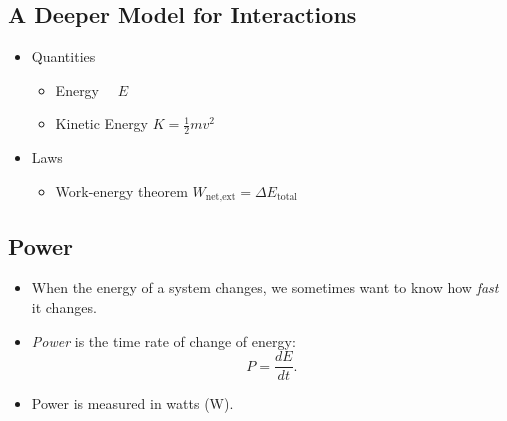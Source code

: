 \documentclass[]{article}
\begin{document}
\newpage
\begin{TeacherMargin}

\end{TeacherMargin}
\begin{PresentSpace}
\vspace{-10pt}
\section*{A Deeper Model for Interactions}
\vspace{-10pt}
\begin{itemize}
	\item Quantities
	\begin{itemize}
		\item Energy \qquad \qquad \qquad \quad \ \ $E$
		\item Kinetic Energy \qquad \qquad $K=\frac{1}{2}mv^{2}$
	\end{itemize}
	\item Laws
	\begin{itemize}
		\item Work-energy theorem \quad $W_{\text{net,ext}} = \Delta E_{\text{total}}$
	\end{itemize}
\end{itemize}
\end{PresentSpace}
\newpage
\begin{TeacherMargin}

\end{TeacherMargin}
\begin{PresentSpace}
\vspace{-10pt}
\section*{Power}
\vspace{-10pt}
\begin{itemize}
	\item When the energy of a system changes, we sometimes want to know how \textit{fast} it changes.
	\item \textit{Power} is the time rate of change of energy:
	\[
	P=\frac{dE}{dt}.
	\]
	\item Power is measured in watts (W).
\end{itemize}
\end{PresentSpace}
\newpage
\end{document}
